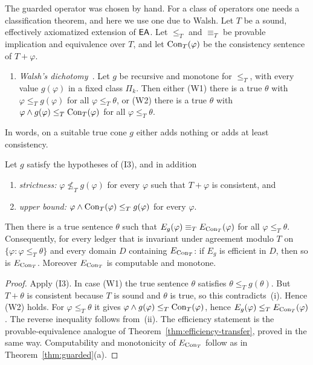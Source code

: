 The guarded operator was chosen by hand. For a class of operators one needs a classification theorem, and here we use one due to Walsh. Let $T$ be a sound, effectively axiomatized extension of $\mathsf{EA}$. Let $\le_T$ and $\equiv_T$ be provable implication and equivalence over $T$, and let $\mathrm{Con}_T(\varphi)$ be the consistency sentence of $T+\varphi$.

\begin{enumerate}
\item[(I3)] \emph{Walsh's dichotomy}~\cite[Theorem~2.4]{Walsh2020Note}. Let $g$ be recursive and monotone for $\le_T$, with every value $g(\varphi)$ in a fixed class $\Pi_k$. Then either (W1) there is a true $\theta$ with $\varphi\le_T g(\varphi)$ for all $\varphi\le_T\theta$, or (W2) there is a true $\theta$ with $\varphi\wedge g(\varphi)\le_T\mathrm{Con}_T(\varphi)$ for all $\varphi\le_T\theta$.
\end{enumerate}

In words, on a suitable true cone $g$ either adds nothing or adds at least consistency.

\begin{theorem}\label{thm:walsh-class}
Let $g$ satisfy the hypotheses of \textup{(I3)}, and in addition
\begin{enumerate}
\item[\textup{(i)}] \emph{strictness:} $\varphi\not\le_T g(\varphi)$ for every $\varphi$ such that $T+\varphi$ is consistent, and
\item[\textup{(ii)}] \emph{upper bound:} $\varphi\wedge\mathrm{Con}_T(\varphi)\le_T g(\varphi)$ for every $\varphi$.
\end{enumerate}
Then there is a true sentence $\theta$ such that $E_g(\varphi)\equiv_T E_{\mathrm{Con}_T}(\varphi)$ for all $\varphi\le_T\theta$. Consequently, for every ledger that is invariant under agreement modulo $T$ on $\{\varphi:\varphi\le_T\theta\}$ and every domain $D$ containing $E_{\mathrm{Con}_T}$: if $E_g$ is efficient in $D$, then so is $E_{\mathrm{Con}_T}$. Moreover $E_{\mathrm{Con}_T}$ is computable and monotone.
\end{theorem}

\begin{proof}
Apply (I3). In case (W1) the true sentence $\theta$ satisfies $\theta\le_T g(\theta)$. But $T+\theta$ is consistent because $T$ is sound and $\theta$ is true, so this contradicts~(i). Hence (W2) holds. For $\varphi\le_T\theta$ it gives $\varphi\wedge g(\varphi)\le_T\mathrm{Con}_T(\varphi)$, hence $E_g(\varphi)\le_T E_{\mathrm{Con}_T}(\varphi)$. The reverse inequality follows from~(ii). The efficiency statement is the provable-equivalence analogue of Theorem~\ref{thm:efficiency-transfer}, proved in the same way. Computability and monotonicity of $E_{\mathrm{Con}_T}$ follow as in Theorem~\ref{thm:guarded}(a).
\end{proof}


